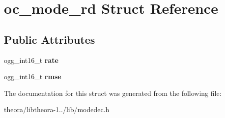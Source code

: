 \hypertarget{structoc__mode__rd}{\section{oc\+\_\+mode\+\_\+rd Struct Reference}
\label{structoc__mode__rd}
}
\subsection*{Public Attributes}
\begin{DoxyCompactItemize}
\item 
\hypertarget{structoc__mode__rd_ac560bc5d06701bb9dbde484af94df16a}{ogg\+\_\+int16\+\_\+t {\bfseries rate}}\label{structoc__mode__rd_ac560bc5d06701bb9dbde484af94df16a}

\item 
\hypertarget{structoc__mode__rd_afc9cc3a043e618c36729965ac006da93}{ogg\+\_\+int16\+\_\+t {\bfseries rmse}}\label{structoc__mode__rd_afc9cc3a043e618c36729965ac006da93}

\end{DoxyCompactItemize}


The documentation for this struct was generated from the following file\+:\begin{DoxyCompactItemize}
\item 
theora/libtheora-\/1../lib/modedec.\+h\end{DoxyCompactItemize}
